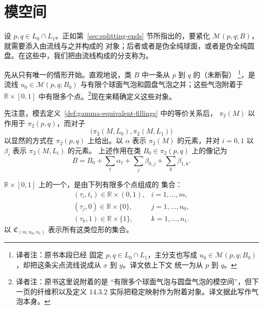 \section{\termBrokenCuspTrajectory{}模空间}
\label{sec:broken-cusp-trajectory-moduli-spaces}

设 $p,q\in L_0\cap L_1$。正如第~\ref{sec:splitting-ends} 节所指出的，要紧化
$\mathcal M(p,q;B)$，就需要添入由\personFloer{}流线与\termBubbleComponent{}之并构成的
对象；后者或者是伪全纯球面，或者是伪全纯圆盘。在这些\termIrreducibleComponent{}中，我们把由\personFloer{}流线构成的分支称为\emph{\termPrincipalComponent{}}。

先从只有唯一\termPrincipalComponent{}的情形开始。直观地说，类 $B$ 中一条从
$p$ 到 $q$ 的（未断裂）\emph{\personFloer{} \termCuspTrajectory{}}\footnote{译者注：原书本段已经
固定 $p,q\in L_0\cap L_1$，主分支也写成
$u_0\in\mathcal M(p,q;B_0)$，却把这条尖点流线说成从 $x$ 到 $y$。译文依上下文
统一为从 $p$ 到 $q$。}，是\personFloer{}流线
$u_0\in\mathcal M(p,q;B_0)$ 与有限个球面气泡和圆盘气泡之并；这些气泡附着于
$\mathbb R\times[0,1]$ 中有限多个点。\footnote{译者注：原书这里说附着的是
“有限多个球面气泡与圆盘气泡的模空间”，但下一页的纤维积以及定义 14.3.2
实际把稳定映射作为附着对象。译文据此写作气泡本身。}现在来精确定义这些对象。

先注意，模去定义~\ref{def:gamma-equivalent-fillings} 中的\personNovikov{}等价关系后，
$\pi_2(M)$ 以\termMonoidalAction{}作用于 $\pi_2(p,q)$，而对子
\[
  \bigl(\pi_2(M,L_0),\pi_2(M,L_1)\bigr)
\]
以显然的方式在 $\pi_2(p,q)$ 上给出\termBiMonoidalAction{}。以 $\alpha$ 表示
$\pi_2(M)$ 的元素，并对 $i=0,1$ 以 $\beta_i$ 表示 $\pi_2(M,L_i)$ 的元素。
上述作用在类 $B_0\in\pi_2(p,q)$ 上的像记为
\[
  B
  =
  B_0+\sum_\ell\alpha_\ell+\sum_j\beta_{0,j}+\sum_k\beta_{1,k}.
\]

\begin{definition}
\label{def:strip-point-configuration}
$\mathbb R\times[0,1]$ 上的一个\termConfiguration{}，是由下列有限多个点组成的
集合：
\[
  \begin{array}{lll}
    (\tau_i,t_i)\in\mathbb R\times(0,1),
      & i=1,\ldots,m,\\
    (\tau_j,0)\in\mathbb R\times\{0\},
      & j=1,\ldots,n_0,\\
    (\tau_k,1)\in\mathbb R\times\{1\},
      & k=1,\ldots,n_1.
  \end{array}
\]
以 $\mathfrak C_{(m;n_0,n_1)}$ 表示所有这类位形的集合。
\end{definition}

